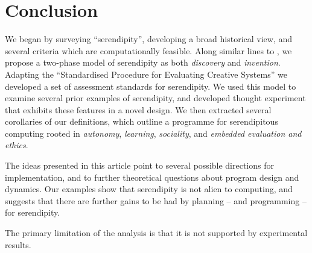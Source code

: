 \section{Conclusion} \label{sec:conclusion}

%
We began by surveying ``serendipity'', developing a broad historical
view, and several criteria which are computationally feasible.  Along
similar lines to , we propose a two-phase
model of serendipity as both \emph{discovery} and \emph{invention}.
%
%
Adapting the ``Standardised Procedure for Evaluating Creative
Systems'' we developed a set of assessment standards for serendipity.
%
%
We used this model to examine several prior examples of serendipity,
and developed thought experiment that exhibits these features in a
novel design.
%
We then extracted several corollaries of our definitions, which
outline a programme for serendipitous computing rooted in
\emph{autonomy}, \emph{learning}, \emph{sociality}, and \emph{embedded
  evaluation and ethics}.


The ideas presented in this article point to several possible
directions for implementation, and to further theoretical questions
about program design and dynamics.  Our examples show that serendipity
is not alien to computing, and suggests that there are further gains
to be had by planning -- and programming -- for serendipity.

The primary limitation of the analysis is that it is not supported by
experimental results.
